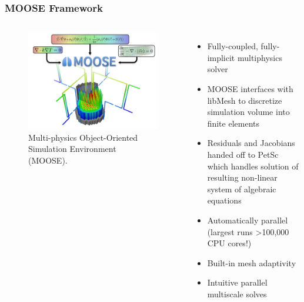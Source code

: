 \begin{frame}
  \frametitle{MOOSE Framework}
  \begin{columns}
    \column[t]{6cm}
  \begin{figure}[t]
     \vspace{-0.25in}
       \hspace*{-0.25in}
       \includegraphics[height=0.65\textheight]{./images/moose.png}
            \caption{Multi-physics Object-Oriented Simulation Environment (MOOSE).}
  \end{figure}
	\column[t]{6cm}
               \begin{itemize}
	       \item Fully-coupled, fully-implicit multiphysics solver
               \item MOOSE interfaces with libMesh to discretize simulation volume into finite elements
               \item Residuals and Jacobians handed off to PetSc which handles solution of resulting non-linear system of algebraic equations
	       \item Automatically parallel (largest runs \textgreater 100,000 CPU cores!)
	       \item Built-in mesh adaptivity
	       \item Intuitive parallel multiscale solves
               \end{itemize}

  \end{columns}
\end{frame}

